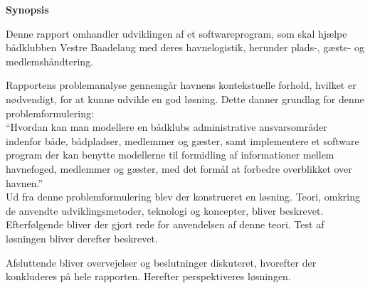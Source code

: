 \begin{center}\textbf{Synopsis}\\ \end{center}

Denne rapport omhandler udviklingen af et softwareprogram, som skal hjælpe bådklubben Vestre Baadelaug med deres havnelogistik, herunder plads-, gæste- og medlemshåndtering.

Rapportens problemanalyse gennemgår havnens kontekstuelle forhold, hvilket er nødvendigt, for at kunne udvikle en god løsning. Dette danner grundlag for denne problemformulering:\\

\enquote{Hvordan kan man modellere en bådklubs administrative ansvarsområder indenfor både, bådpladser, medlemmer og gæster, samt implementere et software program der kan benytte modellerne til formidling af informationer mellem havnefoged, medlemmer og gæster, med det formål at forbedre overblikket over havnen.}\\
	
Ud fra denne problemformulering blev der konstrueret en løsning. Teori, omkring de anvendte udviklingsmetoder, teknologi og koncepter, bliver beskrevet. Efterfølgende bliver der gjort rede for anvendelsen af denne teori. Test af løsningen bliver derefter beskrevet.

Afsluttende bliver overvejelser og beslutninger diskuteret, hvorefter der konkluderes på hele rapporten. Herefter perspektiveres løsningen.
